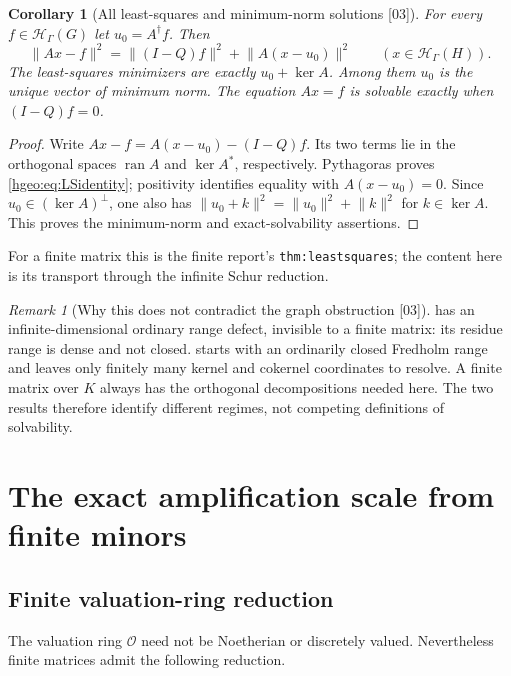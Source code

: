 \documentclass[11pt,letterpaper]{article}
\numberwithin{equation}{section}
\newtheorem{corollary}[corollary]{Corollary}
\theoremstyle{definition}
\theoremstyle{remark}
\newtheorem{remark}[remark]{Remark}
\newcommand{\K}{K}
\newcommand{\HH}[1]{\mathscr H_\Gamma(#1)}
\newcommand{\OO}{\mathcal O}
\newcommand{\ran}{\operatorname{ran}}
\newcommand{\norm}[1]{\lVert #1\rVert}
\newcommand{\src}[1]{\textup{\textsf{\small[#1]}}}
\newcommand{\replabel}[1]{\nolinkurl{#1}}
\begin{document}
\begin{corollary}[All least-squares and minimum-norm solutions \src{03}]
\label{hgeo:cor:LS}
For every $f\in\HH{G}$ let $u_0=A^\dagger f$. Then
\begin{equation}\label{hgeo:eq:LSidentity}
 \norm{Ax-f}^2=\norm{(I-Q)f}^2+\norm{A(x-u_0)}^2
 \qquad(x\in\HH{H}).
\end{equation}
The least-squares minimizers are exactly $u_0+\ker A$.
Among them $u_0$ is the unique vector of minimum norm. The equation
$Ax=f$ is solvable exactly when $(I-Q)f=0$.
\end{corollary}
\begin{proof}
Write $Ax-f=A(x-u_0)-(I-Q)f$. Its two terms lie in the orthogonal
spaces $\ran A$ and $\ker A^*$, respectively. Pythagoras proves
\eqref{hgeo:eq:LSidentity}; positivity identifies equality with
$A(x-u_0)=0$. Since $u_0\in(\ker A)^\perp$, one also has
$\norm{u_0+k}^2=\norm{u_0}^2+\norm{k}^2$ for $k\in\ker A$.
This proves the minimum-norm and exact-solvability assertions.
\end{proof}

For a finite matrix this is the finite report's \replabel{thm:leastsquares};
the content here is its transport through the infinite Schur reduction.

\begin{remark}[Why this does not contradict the graph obstruction \src{03}]
 has an infinite-dimensional ordinary range
defect, invisible to a finite matrix: its residue range is dense
and not closed.  starts with an ordinarily closed
Fredholm range and leaves only finitely many kernel and cokernel
coordinates to resolve. A finite matrix over $\K$ always has the
orthogonal decompositions needed here. The two results therefore
identify different regimes, not competing definitions of solvability.
\end{remark}

\section{The exact amplification scale from finite minors}
\label{hgeo:sec:valuation}

\subsection{Finite valuation-ring reduction}
The valuation ring $\OO$ need not be Noetherian or discretely valued.
Nevertheless finite matrices admit the following reduction.
\end{document}
